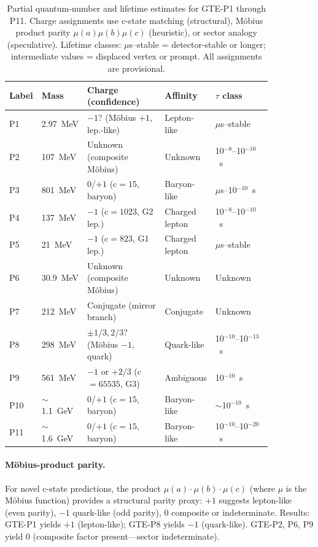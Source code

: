 \documentclass[12pt]{article}
\numberwithin{equation}{section}
\begin{document}
\begin{table}[H]
\centering
\footnotesize
\setlength{\tabcolsep}{3pt}
\renewcommand{\arraystretch}{1.2}
\begin{tabular}{P{0.08\linewidth}P{0.10\linewidth}P{0.30\linewidth}P{0.15\linewidth}P{0.22\linewidth}}
\toprule
Label & Mass & Charge (confidence) & Affinity & $\tau$ class \\
\midrule
P1 & 2.97~MeV & $-1$? (Möbius $+1$, lep.-like) & Lepton-like & $\mu$s–stable \\
P2 & 107~MeV & Unknown (composite Möbius) & Unknown & 10$^{-8}$–10$^{-10}$~s \\
P3 & 801~MeV & 0/$+1$ (c$=15$, baryon) & Baryon-like & $\mu$s–10$^{-10}$~s \\
P4 & 137~MeV & $-1$ (c$=1023$, G2 lep.) & Charged lepton & 10$^{-8}$–10$^{-10}$~s \\
P5 & 21~MeV & $-1$ (c$=823$, G1 lep.) & Charged lepton & $\mu$s–stable \\
P6 & 30.9~MeV & Unknown (composite Möbius) & Unknown & Unknown \\
P7 & 212~MeV & Conjugate (mirror branch) & Conjugate & Unknown \\
P8 & 298~MeV & $\pm 1/3,2/3$? (Möbius $-1$, quark) & Quark-like & 10$^{-10}$–10$^{-13}$~s \\
P9 & 561~MeV & $-1$ or $+2/3$ (c$=65535$, G3) & Ambiguous & 10$^{-10}$~s \\
P10 & $\sim$1.1~GeV & 0/$+1$ (c$=15$, baryon) & Baryon-like & $\sim$10$^{-10}$~s \\
P11 & $\sim$1.6~GeV & 0/$+1$ (c$=15$, baryon) & Baryon-like & 10$^{-10}$–10$^{-20}$~s \\
\bottomrule
\end{tabular}
\caption{Partial quantum-number and lifetime estimates for GTE-P1 through P11. Charge assignments use c-state matching (structural), Möbius product parity $\mu(a)\mu(b)\mu(c)$ (heuristic), or sector analogy (speculative). Lifetime classes: $\mu$s–stable = detector-stable or longer; intermediate values = displaced vertex or prompt. All assignments are provisional.}
\label{tab:qn-assignments}
\end{table}

\paragraph{Möbius-product parity.} For novel c-state predictions, the product $\mu(a)\cdot\mu(b)\cdot\mu(c)$ (where $\mu$ is the Möbius function) provides a structural parity proxy: $+1$ suggests lepton-like (even parity), $-1$ quark-like (odd parity), $0$ composite or indeterminate. Results: GTE-P1 yields $+1$ (lepton-like); GTE-P8 yields $-1$ (quark-like). GTE-P2, P6, P9 yield $0$ (composite factor present---sector indeterminate).
\end{document}
